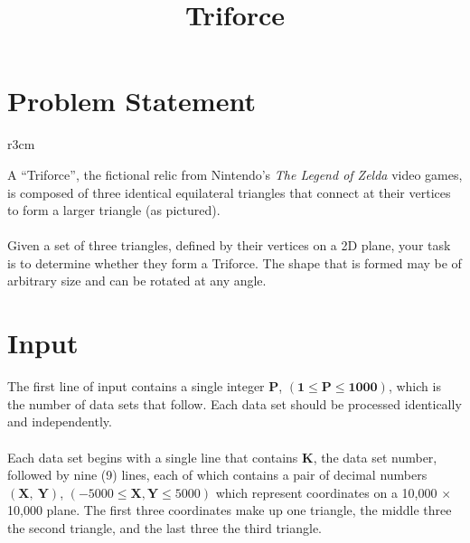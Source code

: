 \documentclass[11pt]{article}
\title{\textbf{Triforce}}
\date{}
\begin{document}
\maketitle

\section{Problem Statement}

\begin{wrapfigure}{r}{3cm}
\end{wrapfigure}
A ``Triforce'', the fictional relic from Nintendo's \emph{The Legend of Zelda}
video games, is composed of three identical equilateral triangles that connect
at their vertices to form a larger triangle (as pictured).
\\\\
Given a set of three triangles, defined by their vertices on a 2D plane,
your task is to determine whether they form a Triforce. The shape that is
formed may be of arbitrary size and can be rotated at any angle.\\

\section{Input}
The first line of input contains a single integer $\boldsymbol{P}$,
$(\boldsymbol{1} \le \boldsymbol{P} \le \boldsymbol{1000})$, which is the
number of data sets that follow. Each data set should be processed identically
and independently.
\\\\
Each data set begins with a single line that contains $\boldsymbol{K}$, the data
set number, followed by nine (9) lines, each of which contains a pair of decimal numbers
$(\boldsymbol{X},\ \boldsymbol{Y})$, $(-5000 \le \boldsymbol{X},\boldsymbol{Y} \le 5000)$
which represent coordinates on a 10,000 $\times$ 10,000 plane. The first three
coordinates make up one triangle, the middle three the second triangle, and
the last three the third triangle.
\end{document}
